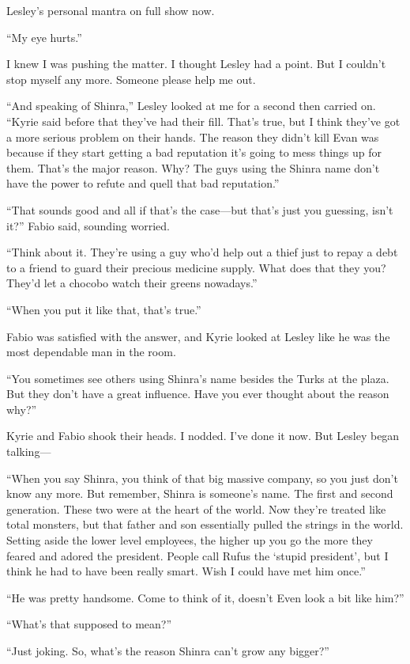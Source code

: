 \documentclass[oneside]{book}
\begin{document}
Lesley’s personal mantra on full show now.

“My eye hurts.”

I knew I was pushing the matter. I thought Lesley had a point. But I couldn’t stop myself any more. Someone please help me out.

“And speaking of Shinra,” Lesley looked at me for a second then carried on. “Kyrie said before that they’ve had their fill. That’s true, but I think they’ve got a more serious problem on their hands. The reason they didn’t kill Evan was because if they start getting a bad reputation it’s going to mess things up for them. That’s the major reason. Why? The guys using the Shinra name don’t have the power to refute and quell that bad reputation.”

“That sounds good and all if that’s the case—but that’s just you guessing, isn’t it?” Fabio said, sounding worried.

“Think about it. They’re using a guy who’d help out a thief just to repay a debt to a friend to guard their precious medicine supply. What does that they you? They’d let a chocobo watch their greens nowadays.”

“When you put it like that, that’s true.”

Fabio was satisfied with the answer, and Kyrie looked at Lesley like he was the most dependable man in the room.

“You sometimes see others using Shinra’s name besides the Turks at the plaza. But they don’t have a great influence. Have you ever thought about the reason why?”

Kyrie and Fabio shook their heads. I nodded. I’ve done it now. But Lesley began talking—

“When you say Shinra, you think of that big massive company, so you just don’t know any more. But remember, Shinra is someone’s name. The first and second generation. These two were at the heart of the world. Now they’re treated like total monsters, but that father and son essentially pulled the strings in the world. Setting aside the lower level employees, the higher up you go the more they feared and adored the president. People call Rufus the ‘stupid president’, but I think he had to have been really smart. Wish I could have met him once.”

“He was pretty handsome. Come to think of it, doesn’t Even look a bit like him?”

“What’s that supposed to mean?”

“Just joking. So, what’s the reason Shinra can’t grow any bigger?”
\end{document}
